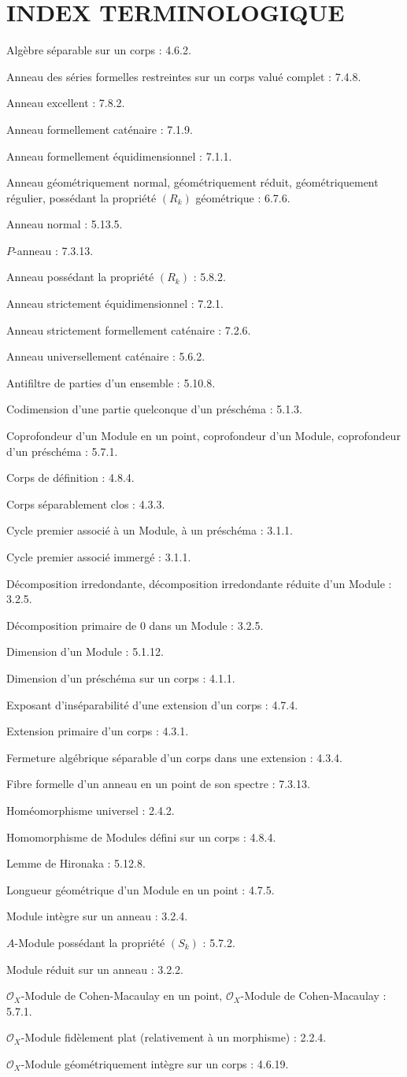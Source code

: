 {}
\section*{INDEX TERMINOLOGIQUE}

\begingroup
\footnotesize
\setlength{\parindent}{0pt}
\setlength{\parskip}{1.1pt}
\newcommand{\EGAIVtwoTerm}[2]{#1 : #2.\par}

\EGAIVtwoTerm{Algèbre séparable sur un corps}{4.6.2}
\EGAIVtwoTerm{Anneau des séries formelles restreintes sur un corps valué complet}{7.4.8}
\EGAIVtwoTerm{Anneau excellent}{7.8.2}
\EGAIVtwoTerm{Anneau formellement caténaire}{7.1.9}
\EGAIVtwoTerm{Anneau formellement équidimensionnel}{7.1.1}
\EGAIVtwoTerm{Anneau géométriquement normal, géométriquement réduit,
géométriquement régulier, possédant la propriété $(R_k)$ géométrique}{6.7.6}
\EGAIVtwoTerm{Anneau normal}{5.13.5}
\EGAIVtwoTerm{$P$-anneau}{7.3.13}
\EGAIVtwoTerm{Anneau possédant la propriété $(R_k)$}{5.8.2}
\EGAIVtwoTerm{Anneau strictement équidimensionnel}{7.2.1}
\EGAIVtwoTerm{Anneau strictement formellement caténaire}{7.2.6}
\EGAIVtwoTerm{Anneau universellement caténaire}{5.6.2}
\EGAIVtwoTerm{Antifiltre de parties d'un ensemble}{5.10.8}

\medskip
\EGAIVtwoTerm{Codimension d'une partie quelconque d'un préschéma}{5.1.3}
\EGAIVtwoTerm{Coprofondeur d'un Module en un point, coprofondeur d'un Module,
coprofondeur d'un préschéma}{5.7.1}
\EGAIVtwoTerm{Corps de définition}{4.8.4}
\EGAIVtwoTerm{Corps séparablement clos}{4.3.3}
\EGAIVtwoTerm{Cycle premier associé à un Module, à un préschéma}{3.1.1}
\EGAIVtwoTerm{Cycle premier associé immergé}{3.1.1}

\medskip
\EGAIVtwoTerm{Décomposition irredondante, décomposition irredondante réduite
d'un Module}{3.2.5}
\EGAIVtwoTerm{Décomposition primaire de $0$ dans un Module}{3.2.5}
\EGAIVtwoTerm{Dimension d'un Module}{5.1.12}
\EGAIVtwoTerm{Dimension d'un préschéma sur un corps}{4.1.1}

\medskip
\EGAIVtwoTerm{Exposant d'inséparabilité d'une extension d'un corps}{4.7.4}
\EGAIVtwoTerm{Extension primaire d'un corps}{4.3.1}

\medskip
\EGAIVtwoTerm{Fermeture algébrique séparable d'un corps dans une extension}{4.3.4}
\EGAIVtwoTerm{Fibre formelle d'un anneau en un point de son spectre}{7.3.13}

\medskip
\EGAIVtwoTerm{Homéomorphisme universel}{2.4.2}
\EGAIVtwoTerm{Homomorphisme de Modules défini sur un corps}{4.8.4}

\medskip
\EGAIVtwoTerm{Lemme de Hironaka}{5.12.8}
\EGAIVtwoTerm{Longueur géométrique d'un Module en un point}{4.7.5}

\medskip
\EGAIVtwoTerm{Module intègre sur un anneau}{3.2.4}
\EGAIVtwoTerm{$A$-Module possédant la propriété $(S_k)$}{5.7.2}
\EGAIVtwoTerm{Module réduit sur un anneau}{3.2.2}
\EGAIVtwoTerm{$\mathcal O_X$-Module de Cohen-Macaulay en un point,
$\mathcal O_X$-Module de Cohen-Macaulay}{5.7.1}
\EGAIVtwoTerm{$\mathcal O_X$-Module fidèlement plat (relativement à un morphisme)}{2.2.4}
\EGAIVtwoTerm{$\mathcal O_X$-Module géométriquement intègre sur un corps}{4.6.19}

\clearpage
